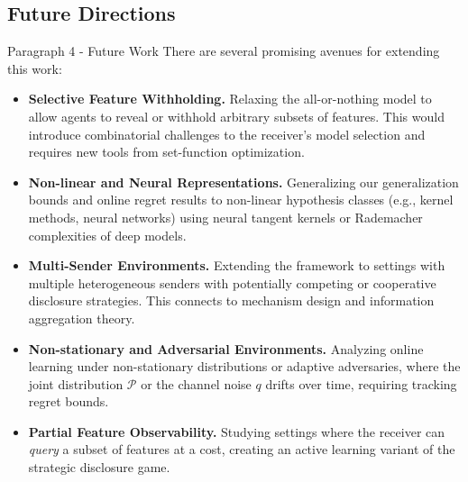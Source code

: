 \begin{faqblock}
\faqanswers
{}
\end{faqblock}

\subsection{Future Directions}
\label{sec:future}

\begin{sourceblock}{Paragraph 4 - Future Work}
There are several promising avenues for extending this work:

\begin{itemize}
    \item \textbf{Selective Feature Withholding.} Relaxing the all-or-nothing model to allow agents to reveal or withhold arbitrary subsets of features. This would introduce combinatorial challenges to the receiver's model selection and requires new tools from set-function optimization.
    
    \item \textbf{Non-linear and Neural Representations.} Generalizing our generalization bounds and online regret results to non-linear hypothesis classes (e.g., kernel methods, neural networks) using neural tangent kernels or Rademacher complexities of deep models.
    
    \item \textbf{Multi-Sender Environments.} Extending the framework to settings with multiple heterogeneous senders with potentially competing or cooperative disclosure strategies. This connects to mechanism design and information aggregation theory.
    
    \item \textbf{Non-stationary and Adversarial Environments.} Analyzing online learning under non-stationary distributions or adaptive adversaries, where the joint distribution $\mathcal{P}$ or the channel noise $q$ drifts over time, requiring tracking regret bounds.
    
    \item \textbf{Partial Feature Observability.} Studying settings where the receiver can \emph{query} a subset of features at a cost, creating an active learning variant of the strategic disclosure game.
\end{itemize}
\end{sourceblock}

\begin{faqblock}
\faqanswers
{}
\end{faqblock}
